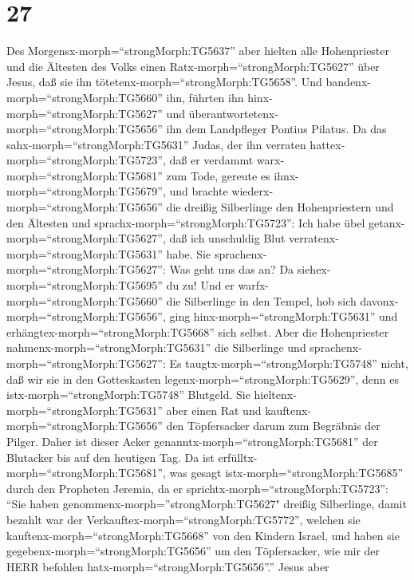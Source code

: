 \hypertarget{section-26}{%
\section{27}\label{section-26}}

 Des Morgensx-morph=``strongMorph:TG5637'' aber hielten alle
Hohenpriester und die Ältesten des Volks einen
Ratx-morph=``strongMorph:TG5627'' über Jesus, daß sie ihn
tötetenx-morph=``strongMorph:TG5658''.  Und
bandenx-morph=``strongMorph:TG5660'' ihn, führten ihn
hinx-morph=``strongMorph:TG5627'' und
überantwortetenx-morph=``strongMorph:TG5656'' ihn dem Landpfleger
Pontius Pilatus.  Da das sahx-morph=``strongMorph:TG5631''
Judas, der ihn verraten hattex-morph=``strongMorph:TG5723'', daß er
verdammt warx-morph=``strongMorph:TG5681'' zum Tode, gereute es
ihnx-morph=``strongMorph:TG5679'', und brachte
wiederx-morph=``strongMorph:TG5656'' die dreißig Silberlinge den
Hohenpriestern und den Ältesten  und
sprachx-morph=``strongMorph:TG5723'': Ich habe übel
getanx-morph=``strongMorph:TG5627'', daß ich unschuldig Blut
verratenx-morph=``strongMorph:TG5631'' habe.  Sie
sprachenx-morph=``strongMorph:TG5627'': Was geht uns das an? Da
siehex-morph=``strongMorph:TG5695'' du zu! Und er
warfx-morph=``strongMorph:TG5660'' die Silberlinge in den Tempel, hob
sich davonx-morph=``strongMorph:TG5656'', ging
hinx-morph=``strongMorph:TG5631'' und
erhängtex-morph=``strongMorph:TG5668'' sich selbst.  Aber
die Hohenpriester nahmenx-morph=``strongMorph:TG5631'' die Silberlinge
und sprachenx-morph=``strongMorph:TG5627'': Es
taugtx-morph=``strongMorph:TG5748'' nicht, daß wir sie in den
Gotteskasten legenx-morph=``strongMorph:TG5629'', denn es
istx-morph=``strongMorph:TG5748'' Blutgeld.  Sie
hieltenx-morph=``strongMorph:TG5631'' aber einen Rat und
kauftenx-morph=``strongMorph:TG5656'' den Töpfersacker darum zum
Begräbnis der Pilger.  Daher ist dieser Acker
genanntx-morph=``strongMorph:TG5681'' der Blutacker bis auf den heutigen
Tag.  Da ist erfülltx-morph=``strongMorph:TG5681'', was
gesagt istx-morph=``strongMorph:TG5685'' durch den Propheten Jeremia, da
er sprichtx-morph=``strongMorph:TG5723'': ``Sie haben
genommenx-morph=''strongMorph:TG5627" dreißig Silberlinge, damit bezahlt
war der Verkauftex-morph=``strongMorph:TG5772'', welchen sie
kauftenx-morph=``strongMorph:TG5668'' von den Kindern Israel,
 und haben sie gegebenx-morph=``strongMorph:TG5656'' um den
Töpfersacker, wie mir der HERR befohlen
hatx-morph=``strongMorph:TG5656''.''  Jesus aber
